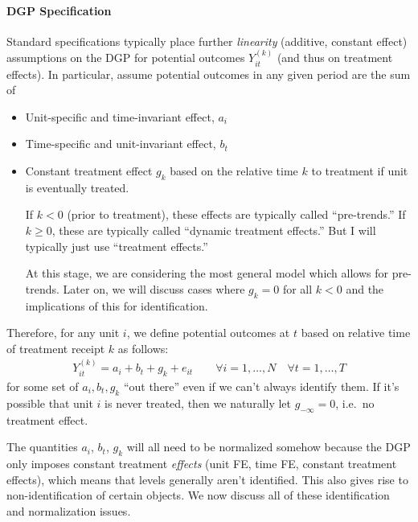 \documentclass[12pt]{article}
\theoremstyle{plain}
\theoremstyle{definition}
\theoremstyle{remark}
\begin{document}
\paragraph{DGP Specification}
Standard specifications typically place further \emph{linearity}
(additive, constant effect) assumptions on the DGP for potential
outcomes $Y_{it}^{(k)}$ (and thus on treatment effects).
In particular, assume potential outcomes in any given period are
the sum of
\begin{itemize}
  \item Unit-specific and time-invariant effect, $a_i$
  \item Time-specific and unit-invariant effect, $b_t$
  \item Constant treatment effect $g_k$ based on the relative time $k$
    to treatment if unit is eventually treated.

    If $k<0$ (prior to treatment), these effects are typically called
    ``pre-trends.''
    If $k\geq 0$, these are typically called ``dynamic treatment
    effects.''
    But I will typically just use ``treatment effects.''

    At this stage, we are considering the most general model which
    allows for pre-trends.
    Later on, we will discuss cases where $g_k=0$ for all $k<0$ and the
    implications of this for identification.
\end{itemize}
Therefore, for any unit $i$, we define potential outcomes at $t$ based
on relative time of treatment receipt $k$ as follows:
\begin{align}
  Y_{it}^{(k)} = a_i + b_t + g_k + e_{it}
  \qquad
  \forall i=1,\ldots,N
  \quad
  \forall t=1,\ldots,T
  \label{dgpt}
\end{align}
for some set of $a_i,b_t,g_k$ ``out there''
even if we can't always identify them.
If it's possible that unit $i$ is never treated, then
we naturally let $g_{-\infty}=0$, i.e.\ no treatment effect.

The quantities $a_i$, $b_t$, $g_k$ will all need to be normalized
somehow because the DGP only imposes constant treatment
\emph{effects} (unit FE, time FE, constant treatment effects),
which means that levels generally aren't identified.
This also gives rise to non-identification of certain objects.
We now discuss all of these identification and normalization issues.

\end{document}
